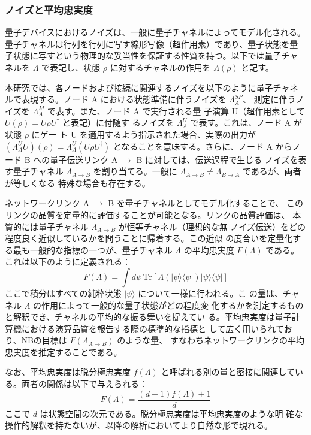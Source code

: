 \documentclass[conference]{IEEEtran}
\begin{document}
\subsubsection*{ノイズと平均忠実度}
\label{sec:org8be629f}
量子デバイスにおけるノイズは、一般に量子チャネルによってモデル化される。
量子チャネルは行列を行列に写す線形写像（超作用素）であり、量子状態を量
子状態に写すという物理的な妥当性を保証する性質を持つ。以下では量子チャ
ネルを \(\Lambda\) で表記し、状態 \(\rho\) に対するチャネルの作用を
\(\Lambda(\rho)\) と記す。

本研究では、各ノードおよび接続に関連するノイズを以下のように量子チャネ
ルで表現する。ノード A における状態準備に伴うノイズを \(\Lambda_A^{SP}\)、
測定に伴うノイズを \(\Lambda_A^M\) で表す。また、ノード A で実行される量
子演算 U（超作用素として \(U(\rho) = U\rho U^\dagger\) と表記）に付随す
るノイズを \(\Lambda_A^U\) で表す。これは、ノード A が状態 \(\rho\) にゲー
ト U を適用するよう指示された場合、実際の出力が \((\Lambda_A^U U)(\rho)
= \Lambda_A^U(U\rho U^\dagger)\) となることを意味する。さらに、ノード A
からノード B への量子伝送リンク A \(\to\) B に対しては、伝送過程で生じる
ノイズを表す量子チャネル \(\Lambda_{A \to B}\) を割り当てる。一般に
\(\Lambda_{A \to B} \neq \Lambda_{B \to A}\) であるが、両者が等しくなる
特殊な場合も存在する。

ネットワークリンク A \(\to\) B を量子チャネルとしてモデル化することで、
このリンクの品質を定量的に評価することが可能となる。リンクの品質評価は、
本質的には量子チャネル \(\Lambda_{A \to B}\) が恒等チャネル（理想的な無
ノイズ伝送）をどの程度良く近似しているかを問うことに帰着する。この近似
の度合いを定量化する最も一般的な指標の一つが、量子チャネル \(\Lambda\)
の平均忠実度 \(F(\Lambda)\) である。これは以下のように定義される：
\begin{equation}
F(\Lambda) = \int d\psi \, \mathrm{Tr}[\Lambda(|\psi\rangle\langle\psi|)|\psi\rangle\langle\psi|]
\end{equation}
ここで積分はすべての純粋状態 \(|\psi\rangle\) について一様に行われる。こ
の量は、チャネル \(\Lambda\) の作用によって一般的な量子状態がどの程度変
化するかを測定するものと解釈でき、チャネルの平均的な振る舞いを捉えてい
る。平均忠実度は量子計算機における演算品質を報告する際の標準的な指標と
して広く用いられており、NBの目標は \(F(\Lambda_{A \to B})\) のような量、
すなわちネットワークリンクの平均忠実度を推定することである。

なお、平均忠実度は脱分極忠実度 \(f(\Lambda)\) と呼ばれる別の量と密接に関連している。両者の関係は以下で与えられる：
\begin{equation}
F(\Lambda) = \frac{(d-1)f(\Lambda) + 1}{d}
\end{equation}
ここで \(d\) は状態空間の次元である。脱分極忠実度は平均忠実度のような明
確な操作的解釈を持たないが、以降の解析においてより自然な形で現れる。
\end{document}
